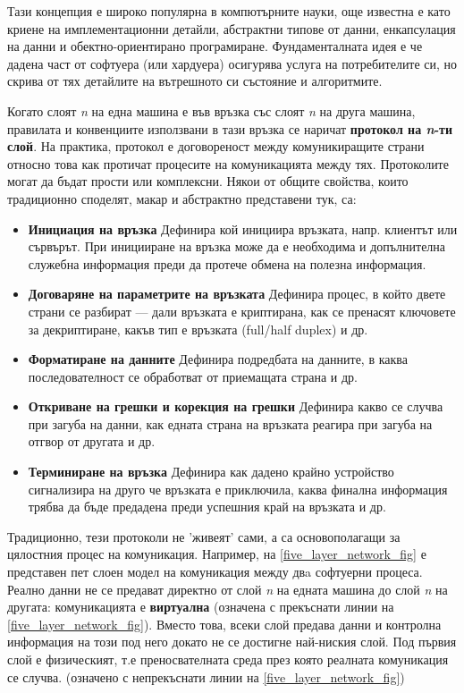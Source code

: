 \documentclass[12pt,a4paper,oneside]{book}
\begin{document}
Тази концепция е широко популярна в компютърните науки, още известна е като
криене на имплементационни детайли, абстрактни типове от данни, енкапсулация на
данни и обектно-ориентирано програмиране. Фундаменталната идея е че дадена част
от софтуера (или хардуера) осигурява услуга на потребителите си, но скрива от
тях детайлите на вътрешното си състояние и алгоритмите.

Когато слоят \textit{n} на една машина е във връзка със слоят \textit{n} на
друга машина, правилата и конвенциите използвани в тази връзка се наричат
\textbf{протокол на \textit{n}-ти слой}. На практика, протокол е договореност
между комуникиращите страни относно това как протичат процесите на
комуникацията между тях.  \cite{tanenbaum_computer_2011} Протоколите могат да
бъдат прости или комплексни. Някои от общите
свойства, които традиционно споделят, макар и абстрактно представени тук, са:

\begin{itemize}
  \item \textbf{Инициация на връзка} Дефинира кой инициира връзката, напр.
    клиентът или сървърът. При иницииране на връзка може да е необходима и
    допълнителна служебна информация преди да протече обмена на полезна
    информация.
  \item \textbf{Договаряне на параметрите на връзката} Дефинира процес, в който
    двете страни се разбират --- дали връзката е криптирана, как се пренасят
    ключовете за декриптиране, какъв тип е връзката (full/half duplex) и др.
  \item \textbf{Форматиране на данните} Дефинира подредбата на данните, в каква
    последователност се обработват от приемащата страна и др.
  \item \textbf{Откриване на грешки и корекция на грешки} Дефинира какво се
    случва при загуба на данни, как едната страна на връзката реагира при загуба
    на отгвор от другата и др.
  \item \textbf{Терминиране на връзка} Дефинира как дадено крайно устройство
    сигнализира на друго че връзката е приключила, каква финална информация
    трябва да бъде предадена преди успешния край на връзката и др.
\end{itemize}

Традиционно, тези протоколи не 'живеят' сами, а са основополагащи за цялостния
процес на комуникация.  Например, на \autoref{five_layer_network_fig} е
представен пет слоен модел на комуникация между двa софтуерни процеса. Реално
данни не се предават директно от слой \textit{n} на едната машина до слой
\textit{n} на другата: комуникацията е \textbf{виртуална} (означена с прекъснати
линии на \autoref{five_layer_network_fig}).
Вместо това, всеки слой предава данни и контролна информация на този под него
докато не се достигне най-ниския слой. Под първия слой е физическият, т.е
преносвателната среда през която реалната комуникация се случва. (означено с
непрекъснати линии на \autoref{five_layer_network_fig})
\end{document}
